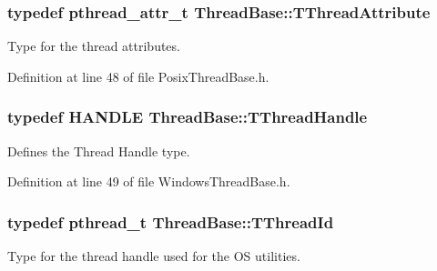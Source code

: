\hypertarget{class_thread_base_adea5ffdf2c74b95dbfee5148248f93b8}{
\subsubsection[{T\-Thread\-Attribute}]{\setlength{\rightskip}{0pt plus 5cm}typedef pthread\-\_\-attr\-\_\-t {\bf Thread\-Base\-::\-T\-Thread\-Attribute}\hspace{0.3cm}{\ttfamily [private]}}}\label{class_thread_base_adea5ffdf2c74b95dbfee5148248f93b8}


Type for the thread attributes. 



Definition at line 48 of file Posix\-Thread\-Base.\-h.

\hypertarget{class_thread_base_ad87b599650c2062b6ff7e54934da7e2b}{
\subsubsection[{T\-Thread\-Handle}]{\setlength{\rightskip}{0pt plus 5cm}typedef H\-A\-N\-D\-L\-E {\bf Thread\-Base\-::\-T\-Thread\-Handle}\hspace{0.3cm}{\ttfamily [private]}}}\label{class_thread_base_ad87b599650c2062b6ff7e54934da7e2b}


Defines the Thread Handle type. 



Definition at line 49 of file Windows\-Thread\-Base.\-h.

\hypertarget{class_thread_base_af8ec97aa7d89f9a4605a1c6c60777d5d}{
\subsubsection[{T\-Thread\-Id}]{\setlength{\rightskip}{0pt plus 5cm}typedef pthread\-\_\-t {\bf Thread\-Base\-::\-T\-Thread\-Id}\hspace{0.3cm}{\ttfamily [private]}}}\label{class_thread_base_af8ec97aa7d89f9a4605a1c6c60777d5d}


Type for the thread handle used for the O\-S utilities. 



